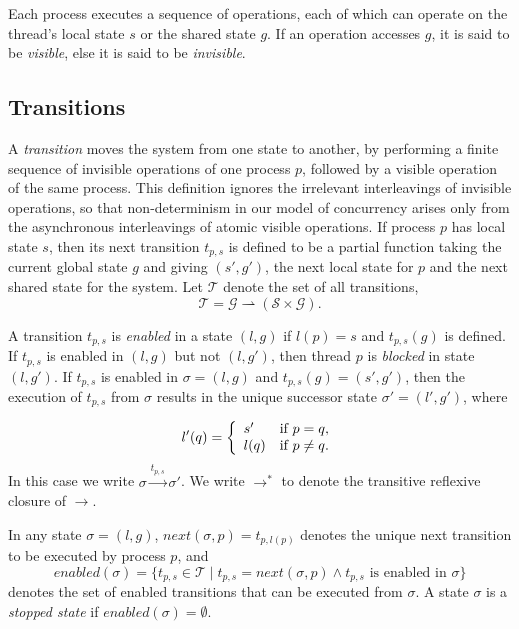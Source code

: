 \documentclass[12pt,a4paper,twoside,openright]{report}
\begin{document}
Each process executes a sequence of operations, each of which can
operate on the thread's local state $s$ or the shared
state $g$. If an operation
accesses $g$, it is said to be \emph{visible}, else it is said to be
\emph{invisible}.

\subsection{Transitions}
\label{sec:trans-prep}
A \emph{transition} moves the system from one state to another,
by performing a finite sequence of invisible operations of one
process $p$, followed by a visible operation of the same
process. This definition ignores the irrelevant
interleavings of invisible operations, so that
non-determinism in our model of concurrency
arises only from the asynchronous interleavings of
atomic visible operations.
If process $p$ has local state $s$, then its next transition $t_{p,s}$
is defined to be a partial function taking the current
global state $g$ and giving $(s', g')$, the next local state for $p$
and the next shared state for the system. Let $\mathcal{T}$ denote the
set of all transitions,
	\[\mathcal{T} = \mathcal{G} \rightharpoonup
				(\mathcal{S} \times \mathcal{G}).\]

A transition $t_{p,s}$ is \emph{enabled} in a state
$(l, g)$ if $l(p) = s$ and $t_{p,s}(g)$ is defined.
If $t_{p,s}$ is enabled in $(l, g)$ but not $(l, g')$,
then thread $p$ is \emph{blocked} in
state $(l, g')$.
If $t_{p,s}$ is enabled in $\sigma = (l, g)$ and 
$t_{p,s}(g) = (s', g')$, then the
execution of $t_{p,s}$ from $\sigma$ results in the unique successor
state $\sigma' = (l', g')$, where

\[
	l'(q) = \left\{\begin{array}{lr}
				s' & \textmd{if } p = q, \\
				l(q) &\textmd{if } p \neq q.
			\end{array} \right.
\]
In this case we write $\sigma \xrightarrow{t_{p,s}} \sigma'$.
We write $\longrightarrow^*$ to denote the transitive reflexive
closure of $\longrightarrow$.

In any state $\sigma = (l, g)$,
$\textit{next}(\sigma, p) = t_{p,l(p)}$ denotes the unique next transition
to be executed by process $p$, and
\[
	\textit{enabled}(\sigma) = \{t_{p,s} \in \mathcal{T} \mid
	t_{p,s} = \textit{next}(\sigma, p)
	\wedge t_{p,s} \text{ is enabled in } \sigma\}
\]
denotes the set of enabled transitions that can be executed from $\sigma$.
A state $\sigma$ is a \emph{stopped state} if
$\textit{enabled}(\sigma) = \emptyset$.
\end{document}

